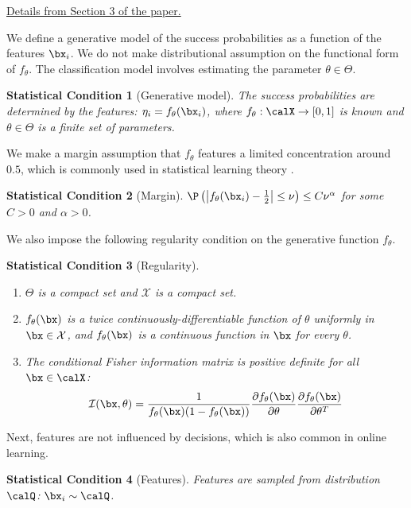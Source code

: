 \documentclass[11pt]{article}
\newtheorem{stat}{Statistical Condition}[]
\begin{document}
\underline{Details from Section 3 of the paper.}

We define a generative model of the success probabilities as a function of the features $\bx_{i}$. We do not make distributional assumption on the functional form of $f_\theta$. The classification model involves estimating the parameter $\theta\in\Theta$.
\begin{stat}[Generative model]\label{ass:known_AE}
The success probabilities are determined by the features: $\eta_{i} = f_\theta(\bx_{i})$, where $f_\theta:\calX\to[0,1]$ is known and $\theta\in\Theta$ is a finite set of parameters. 
\end{stat}

We make a margin assumption that $f_\theta$ features a limited concentration around $0.5$, which is commonly used in statistical learning theory \citep[e.g.,][]{boucheron2005theory, tsybakov2004optimal}.
\begin{stat}[Margin]\label{ass:margin_AE}
$\P\left(\left|f_\theta(\bx_{i})-\frac{1}{2}\right|\leq\nu\right)\leq C \nu^{\alpha}$ for some $C>0$ and $\alpha>0$.
\end{stat}

We also impose the following regularity condition on the generative function $f_\theta$.
\begin{stat}[Regularity]\label{ass:regularity_AE}
\begin{enumerate}
    \item $\Theta$ is a compact set and $\mathcal{X}$ is a compact set.
    \item $f_\theta(\bx)$ is a twice continuously-differentiable function of $\theta$ uniformly in $\bx \in \mathcal{X}$, and $f_\theta(\bx)$ is a continuous function in $\bx$ for every $\theta$. 
    \item The conditional Fisher information matrix is positive definite for all $\bx\in\calX$:
    \[\mathcal{I}(\bx,\theta) = \frac{1}{f_\theta(\bx)(1-f_\theta(\bx))}\frac{\partial f_\theta(\bx)}{\partial \theta}\frac{\partial f_\theta(\bx)}{\partial \theta^T} \]
\end{enumerate}
\end{stat}

Next, features are not influenced by decisions, which is also common in online learning.

\begin{stat}[Features]\label{ass:features_AE}
    Features are sampled from distribution $\calQ$:
    $\bx_{i}\sim \calQ$.
\end{stat}
\end{document}
